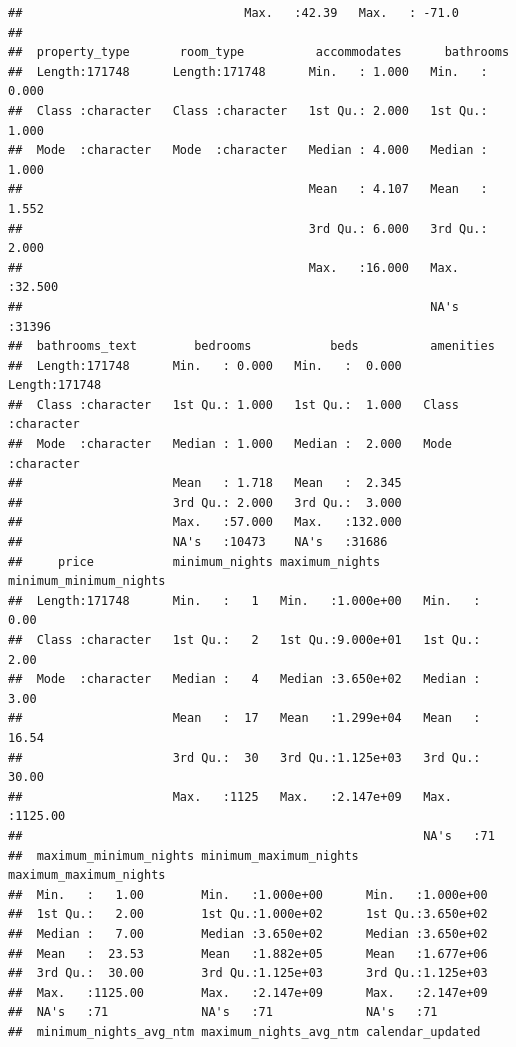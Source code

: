 \documentclass[
]{article}
\begin{document}
\begin{verbatim}
##                               Max.   :42.39   Max.   : -71.0  
##                                                               
##  property_type       room_type          accommodates      bathrooms     
##  Length:171748      Length:171748      Min.   : 1.000   Min.   : 0.000  
##  Class :character   Class :character   1st Qu.: 2.000   1st Qu.: 1.000  
##  Mode  :character   Mode  :character   Median : 4.000   Median : 1.000  
##                                        Mean   : 4.107   Mean   : 1.552  
##                                        3rd Qu.: 6.000   3rd Qu.: 2.000  
##                                        Max.   :16.000   Max.   :32.500  
##                                                         NA's   :31396   
##  bathrooms_text        bedrooms           beds          amenities        
##  Length:171748      Min.   : 0.000   Min.   :  0.000   Length:171748     
##  Class :character   1st Qu.: 1.000   1st Qu.:  1.000   Class :character  
##  Mode  :character   Median : 1.000   Median :  2.000   Mode  :character  
##                     Mean   : 1.718   Mean   :  2.345                     
##                     3rd Qu.: 2.000   3rd Qu.:  3.000                     
##                     Max.   :57.000   Max.   :132.000                     
##                     NA's   :10473    NA's   :31686                       
##     price           minimum_nights maximum_nights      minimum_minimum_nights
##  Length:171748      Min.   :   1   Min.   :1.000e+00   Min.   :   0.00       
##  Class :character   1st Qu.:   2   1st Qu.:9.000e+01   1st Qu.:   2.00       
##  Mode  :character   Median :   4   Median :3.650e+02   Median :   3.00       
##                     Mean   :  17   Mean   :1.299e+04   Mean   :  16.54       
##                     3rd Qu.:  30   3rd Qu.:1.125e+03   3rd Qu.:  30.00       
##                     Max.   :1125   Max.   :2.147e+09   Max.   :1125.00       
##                                                        NA's   :71            
##  maximum_minimum_nights minimum_maximum_nights maximum_maximum_nights
##  Min.   :   1.00        Min.   :1.000e+00      Min.   :1.000e+00     
##  1st Qu.:   2.00        1st Qu.:1.000e+02      1st Qu.:3.650e+02     
##  Median :   7.00        Median :3.650e+02      Median :3.650e+02     
##  Mean   :  23.53        Mean   :1.882e+05      Mean   :1.677e+06     
##  3rd Qu.:  30.00        3rd Qu.:1.125e+03      3rd Qu.:1.125e+03     
##  Max.   :1125.00        Max.   :2.147e+09      Max.   :2.147e+09     
##  NA's   :71             NA's   :71             NA's   :71            
##  minimum_nights_avg_ntm maximum_nights_avg_ntm calendar_updated

\end{verbatim}
\end{document}
